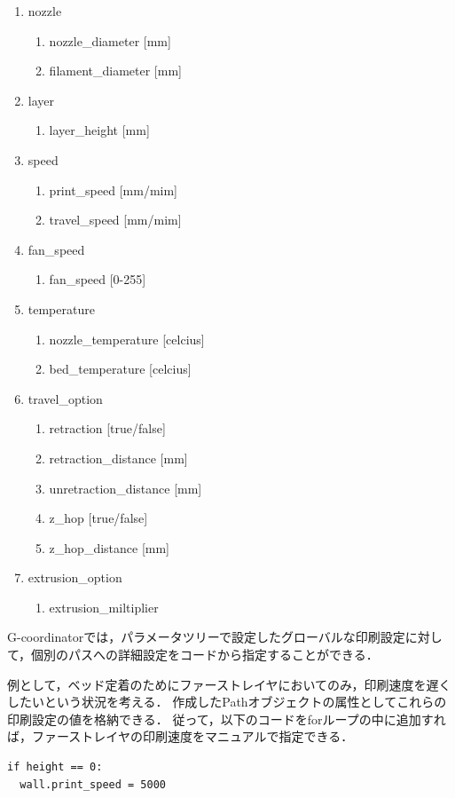 \documentclass{article}
\begin{document}
\begin{twocolumn}
\begin{itemize}
\begin{enumerate}
  \item nozzle
  \begin{enumerate}
    \item nozzle\_diameter [mm]
    \item filament\_diameter [mm]
  \end{enumerate}
  \item layer
  \begin{enumerate}
    \item layer\_height [mm]
  \end{enumerate}
  \item speed
  \begin{enumerate}
    \item print\_speed [mm/mim]
    \item travel\_speed [mm/mim]
  \end{enumerate}
  \item fan\_speed
  \begin{enumerate}
    \item fan\_speed [0-255]
  \end{enumerate}
  \item temperature
  \begin{enumerate}
    \item nozzle\_temperature [celcius]
    \item bed\_temperature [celcius]
  \end{enumerate}
  \item travel\_option
  \begin{enumerate}
    \item retraction [true/false]
    \item retraction\_distance [mm]
    \item unretraction\_distance [mm]
    \item z\_hop [true/false]
    \item z\_hop\_distance [mm]
  \end{enumerate}
  \item extrusion\_option
  \begin{enumerate}
    \item extrusion\_miltiplier
  \end{enumerate}
\end{enumerate}

G-coordinatorでは，パラメータツリーで設定したグローバルな印刷設定に対して，個別のパスへの詳細設定をコードから指定することができる．

例として，ベッド定着のためにファーストレイヤにおいてのみ，印刷速度を遅くしたいという状況を考える．
作成したPathオブジェクトの属性としてこれらの印刷設定の値を格納できる．
従って，以下のコードをforループの中に追加すれば，ファーストレイヤの印刷速度をマニュアルで指定できる．
\begin{lstlisting}
if height == 0:
  wall.print_speed = 5000
\end{lstlisting}


\end{itemize}
\end{twocolumn}
\end{document}
